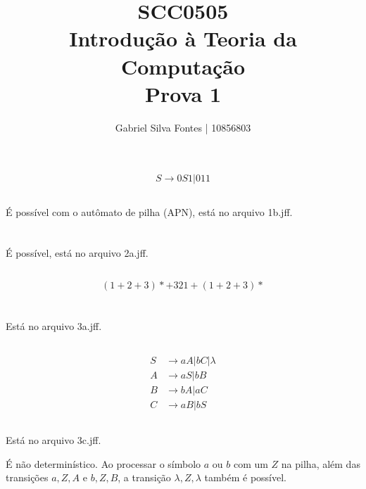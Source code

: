 \documentclass[12pt]{article}
\title{SCC0505 \\ Introdução à Teoria da Computação \\ Prova 1}
\author{Gabriel Silva Fontes | 10856803}
\begin{document}
\maketitle

\section{}
\subsection{}
\[
    S \rightarrow 0S1|011
\]

\subsection{}
É possível com o autômato de pilha (APN), está no arquivo 1b.jff.

\section{}
\subsection{}
É possível, está no arquivo 2a.jff.
\subsection{}
\[(1+2+3) *+321+(1+2+3) *\]

\section{}
\subsection{}
Está no arquivo 3a.jff.
\subsection{}
\begin{align*}
    S &\rightarrow aA | bC | \lambda \\
    A &\rightarrow aS | bB \\
    B &\rightarrow bA | aC \\
    C &\rightarrow aB | bS
\end{align*}
\subsection{}
Está no arquivo 3c.jff.

É não determinístico. Ao processar o símbolo \(a\) ou \(b\) com um \(Z\) na pilha, além das transições \(a,Z,A\) e \(b,Z,B\), a transição \(\lambda,Z,\lambda\) também é possível.
\end{document}
